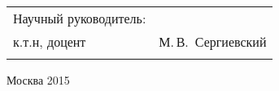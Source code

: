 \begin{titlepage}
\begin{center}
\begin{tabular}{ p{}p{} }
      \vfill
      Научный руководитель:\\
      к.т.н, доцент & М.\,В.~Сергиевский \\
      & \\
    \end{tabular}
    \vfill
    {\normalsize Москва 2015}
  \end{center}
\end{titlepage}


